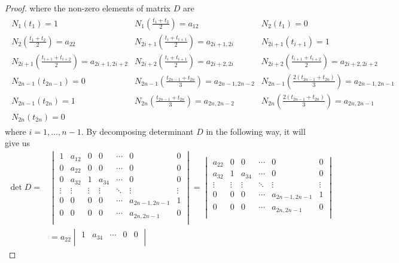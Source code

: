 \begin{proof}
where the non-zero elements of matrix $D$ are \begin{align*}
\begin{matrix}
N_1(t_1)=1 & N_1\left(\frac{t_1+t_2}{2}\right)=a_{12} &  N_2(t_1)=0 \\ N_2\left(\frac{t_1+t_2}{2}\right)=a_{22} & N_{2i+1}\left(\frac{t_i+t_{i+1}}{2}\right)=a_{2i+1,2i} & N_{2i+1}(t_{i+1})=1  \\ 
N_{2i+1}\left(\frac{t_{i+1}+t_{i+2}}{2}\right)=a_{2i+1,2i+2}  & 
N_{2i+2}\left(\frac{t_i+t_{i+1}}{2}\right)=a_{2i+2,2i} &
N_{2i+2}\left(\frac{t_{i+1}+t_{i+2}}{2}\right)=a_{2i+2,2i+2} \\
 N_{2n-1}(t_{2n-1})=0 & N_{2n-1}\left(\frac{t_{2n-1}+t_{2n}}{3}\right)=a_{2n-1,2n-2} &
N_{2n-1}\left(\frac{2(t_{2n-1}+t_{2n})}{3}\right)=a_{2n-1,2n-1} \\
N_{2n-1}(t_{2n})=1 & N_{2n}(\frac{t_{2n-1}+t_{2n}}{3})=a_{2n,2n-2} &
N_{2n}\left(\frac{2(t_{2n-1}+t_{2n})}{3}\right)=a_{2n,2n-1} \\
N_{2n}(t_{2n})=0 
\end{matrix}
\end{align*}
where $i=1,\ldots,n-1$. By decomposing determinant $D$ in the following way, it will give us 
\begin{align*}
\det D= & 
\begin{vmatrix}
1 & a_{12} & 0 & 0 & \cdots& 0 & 0 \\
0 & a_{22} & 0 & 0 & \cdots& 0 & 0\\
0 & a_{32} & 1 & a_{34} & \cdots& 0 & 0\\
 \vdots  &  \vdots  &  \vdots &  \vdots & \ddots  & \vdots   &  \vdots\\  
0 & 0 & 0 & 0 & \cdots& a_{2n-1,2n-1} & 1\\
0 & 0 & 0 & 0 & \cdots& a_{2n,2n-1} & 0 \\
\end{vmatrix} =
\begin{vmatrix}
 a_{22} & 0 & 0 & \cdots& 0 & 0\\
 a_{32} & 1 & a_{34} & \cdots& 0 & 0\\
  \vdots  &  \vdots &  \vdots & \ddots  & \vdots   &  \vdots\\  
0 & 0 & 0 & \cdots& a_{2n-1,2n-1} & 1\\
0 & 0 & 0 & \cdots& a_{2n,2n-1} & 0 \\
\end{vmatrix} 
\\ &=a_{22}
\begin{vmatrix}
 1 & a_{34} & \cdots& 0 & 0\\

\end{vmatrix}
\end{align*}
\end{proof}
